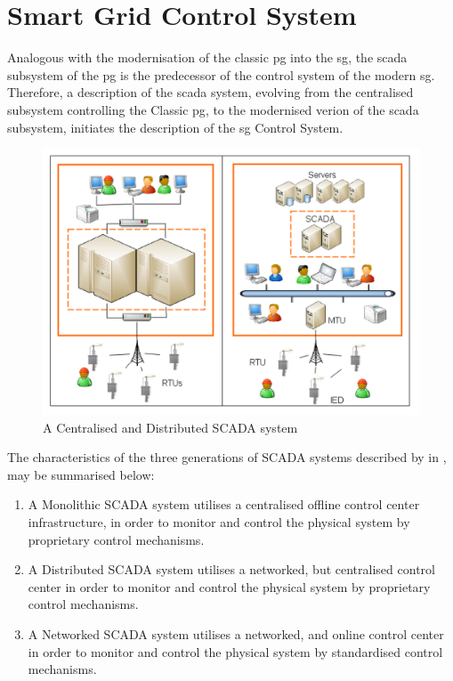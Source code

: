 \section{Smart Grid Control System}

Analogous with the modernisation of the classic \acrlong{pg} into the \acrlong{sg}, the \acrshort{scada} subsystem of the \acrshort{pg} is the predecessor of the control system of the modern \acrlong{sg}.
Therefore, a description of the \acrshort{scada} system, evolving from the centralised subsystem controlling the Classic \acrshort{pg}, to the modernised verion of the \acrshort{scada} subsystem, initiates the description of the \acrlong{sg} Control System. 



 
   \begin{figure}[ht]

    \includegraphics[width=\textwidth]{figures/SCADA-CentralisedAndDistributed.png}    


\caption[A Centralised and Distributed SCADA system]{A Centralised and Distributed SCADA system \cite[p. 123]{alcaraz2012security}}
\label{fig:SCADA-CentralisedAndDistributed}
\end{figure}



The characteristics of the three generations of SCADA systems described by  in \cite{alcaraz2012security}, may be summarised below:
 

 \begin{enumerate}
     \item A Monolithic SCADA system utilises a centralised offline control center  infrastructure, in order to monitor and control the physical system by proprietary control mechanisms.
     \item A Distributed SCADA system utilises a networked, but centralised control  center in order to monitor and control the physical system by proprietary control mechanisms. 
     \item A Networked SCADA system utilises a networked, and online control  center in order to monitor and control the physical system by standardised control mechanisms.
 \end{enumerate}



